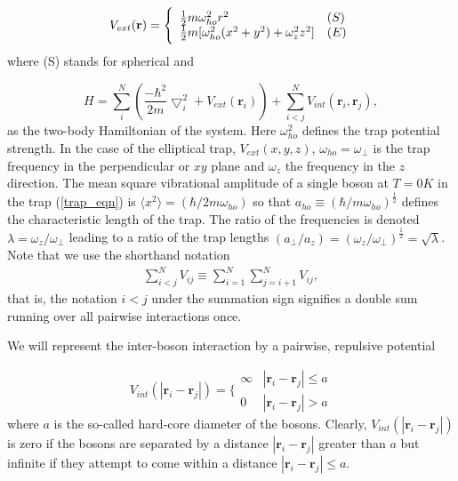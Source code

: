 \documentclass[%
oneside,                 %
final,                   %
10pt]{article}
\begin{document}
\begin{equation}
 V_{ext}(\mathbf{r}) = 
 \Bigg\{
 \begin{array}{ll}
	 \frac{1}{2}m\omega_{ho}^2r^2 & (S)\\
 \strut
	 \frac{1}{2}m[\omega_{ho}^2(x^2+y^2) + \omega_z^2z^2] & (E)
 \label{trap_eqn}
 \end{array}
 \end{equation}
 where (S) stands for spherical and

\begin{equation}
     H = \sum_i^N \left(\frac{-\hbar^2}{2m}{\bigtriangledown }_{i}^2 +V_{ext}({\mathbf{r}}_i)\right)  +
	 \sum_{i<j}^{N} V_{int}({\mathbf{r}}_i,{\mathbf{r}}_j),
 \end{equation}
 as the two-body Hamiltonian of the system.  Here $\omega_{ho}^2$
 defines the trap potential strength.  In the case of the elliptical
 trap, $V_{ext}(x,y,z)$, $\omega_{ho}=\omega_{\perp}$ is the trap
 frequency in the perpendicular or $xy$ plane and $\omega_z$ the
 frequency in the $z$ direction.  The mean square vibrational
 amplitude of a single boson at $T=0K$ in the trap (\ref{trap_eqn}) is
 $\langle x^2\rangle=(\hbar/2m\omega_{ho})$ so that $a_{ho} \equiv
 (\hbar/m\omega_{ho})^{\frac{1}{2}}$ defines the characteristic length
 of the trap.  The ratio of the frequencies is denoted
 $\lambda=\omega_z/\omega_{\perp}$ leading to a ratio of the trap
 lengths $(a_{\perp}/a_z)=(\omega_z/\omega_{\perp})^{\frac{1}{2}} =
 \sqrt{\lambda}$. Note that we use the shorthand notation
\begin{align}
    \sum_{i < j}^{N} V_{ij} \equiv \sum_{i = 1}^{N}\sum_{j = i + 1}^{N} V_{ij},
\end{align}
 that is, the notation $i < j$ under the summation sign signifies a double sum
 running over all pairwise interactions once.

 We will represent the inter-boson interaction by a pairwise,
 repulsive potential

\begin{equation}
 V_{int}(|\mathbf{r}_i-\mathbf{r}_j|) =  \Bigg\{
 \begin{array}{ll}
	 \infty & {|\mathbf{r}_i-\mathbf{r}_j|} \leq {a}\\
	 0 & {|\mathbf{r}_i-\mathbf{r}_j|} > {a}
 \end{array}
 \end{equation}
 where $a$ is the so-called hard-core diameter of the bosons.
 Clearly, $V_{int}(|\mathbf{r}_i-\mathbf{r}_j|)$ is zero if the bosons are
 separated by a distance $|\mathbf{r}_i-\mathbf{r}_j|$ greater than $a$ but
 infinite if they attempt to come within a distance $|\mathbf{r}_i-\mathbf{r}_j| \leq a$.
\end{document}

